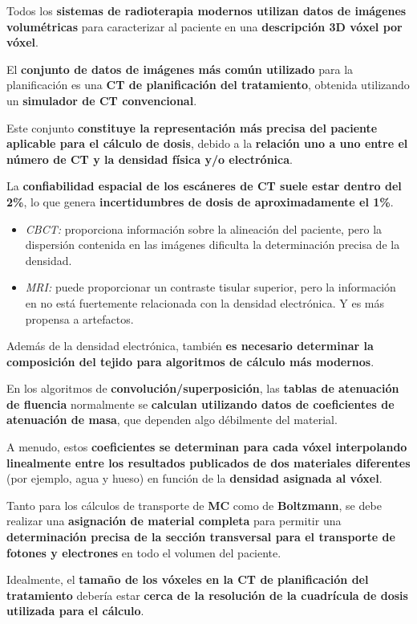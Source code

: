 \documentclass[aspectratio=169,xcolor=dvipsnames,t]{beamer}
\begin{document}
\begin{frame}

    Todos los \textbf{sistemas de radioterapia modernos utilizan datos de imágenes volumétricas} para caracterizar al paciente en una \textbf{descripción 3D vóxel por vóxel}.
    
    El \textbf{conjunto de datos de imágenes más común utilizado} para la planificación es una \textbf{CT de planificación del tratamiento}, obtenida utilizando un \textbf{simulador de CT convencional}.

    Este conjunto \textbf{constituye la representación más precisa del paciente aplicable para el cálculo de dosis}, debido a la \textbf{relación uno a uno entre el número de CT y la densidad física y/o electrónica}.

    La \textbf{confiabilidad espacial de los escáneres de CT suele estar dentro del 2\%}, lo que genera \textbf{incertidumbres de dosis de aproximadamente el 1\%}.

    \begin{itemize}
        \item \textit{CBCT:} proporciona información sobre la alineación del paciente, pero la dispersión contenida en las imágenes dificulta la determinación precisa de la densidad.
        \item  \textit{MRI:} puede proporcionar un contraste tisular superior, pero la información en no está fuertemente relacionada con la densidad electrónica. Y es más propensa a artefactos.
    \end{itemize}

\end{frame}

\begin{frame}

    Además de la densidad electrónica, también \textbf{es necesario determinar la composición del tejido para algoritmos de cálculo más modernos}.

    En los algoritmos de \textbf{convolución/superposición}, las \textbf{tablas de atenuación de fluencia} normalmente se \textbf{calculan utilizando datos de coeficientes de atenuación de masa}, que dependen algo débilmente del material. 
    
    A menudo, estos \textbf{coeficientes se determinan para cada vóxel interpolando linealmente entre los resultados publicados de dos materiales diferentes} (por ejemplo, agua y hueso) en función de la \textbf{densidad asignada al vóxel}.
    
    Tanto para los cálculos de transporte de \textbf{MC} como de \textbf{Boltzmann}, se debe realizar una \textbf{asignación de material completa} para permitir una \textbf{determinación precisa de la sección transversal para el transporte de fotones y electrones} en todo el volumen del paciente.

    Idealmente, el \textbf{tamaño de los vóxeles en la CT de planificación del tratamiento} debería estar \textbf{cerca de la resolución de la cuadrícula de dosis utilizada para el cálculo}.

\end{frame}
\end{document}
